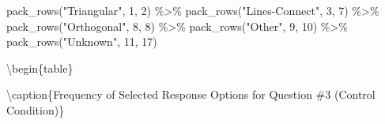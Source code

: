 \documentclass[
  letterpaper,
  DIV=11,
  numbers=noendperiod]{scrreprt}
\newenvironment{Shaded}{\begin{snugshade}}{\end{snugshade}}
\newcommand{\DecValTok}[1]{\textcolor[rgb]{0.68,0.00,0.00}{#1}}
\newcommand{\FunctionTok}[1]{\textcolor[rgb]{0.28,0.35,0.67}{#1}}
\newcommand{\NormalTok}[1]{\textcolor[rgb]{0.00,0.23,0.31}{#1}}
\newcommand{\SpecialCharTok}[1]{\textcolor[rgb]{0.37,0.37,0.37}{#1}}
\newcommand{\StringTok}[1]{\textcolor[rgb]{0.13,0.47,0.30}{#1}}
\begin{document}
\begin{Shaded}
\begin{Highlighting}[]
  \FunctionTok{pack\_rows}\NormalTok{(}\StringTok{"Triangular"}\NormalTok{, }\DecValTok{1}\NormalTok{, }\DecValTok{2}\NormalTok{) }\SpecialCharTok{\%\textgreater{}\%} 
  \FunctionTok{pack\_rows}\NormalTok{(}\StringTok{"Lines{-}Connect"}\NormalTok{, }\DecValTok{3}\NormalTok{, }\DecValTok{7}\NormalTok{) }\SpecialCharTok{\%\textgreater{}\%} 
  \FunctionTok{pack\_rows}\NormalTok{(}\StringTok{"Orthogonal"}\NormalTok{, }\DecValTok{8}\NormalTok{, }\DecValTok{8}\NormalTok{) }\SpecialCharTok{\%\textgreater{}\%} 
  \FunctionTok{pack\_rows}\NormalTok{(}\StringTok{"Other"}\NormalTok{, }\DecValTok{9}\NormalTok{, }\DecValTok{10}\NormalTok{) }\SpecialCharTok{\%\textgreater{}\%} 
  \FunctionTok{pack\_rows}\NormalTok{(}\StringTok{"Unknown"}\NormalTok{, }\DecValTok{11}\NormalTok{, }\DecValTok{17}\NormalTok{)  }
\end{Highlighting}
\end{Shaded}

\textbackslash begin\{table\}

\textbackslash caption\{\label{tab:Q3-CONTROL-RESPONSES}Frequency of
Selected Response Options for Question \#3 (Control Condition)\}
\centering
\end{document}
